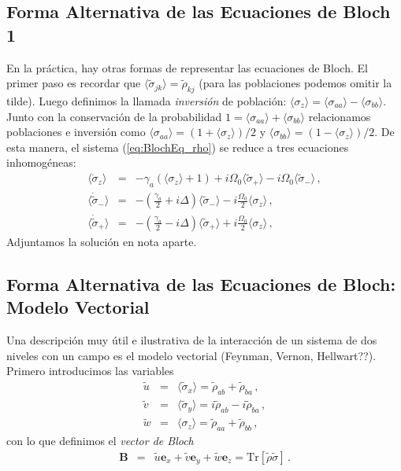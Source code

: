 \documentclass[12pt]{report}
\newcommand{\mbe}{\mathbf{e}}
\newcommand{\mbB}{\mathbf{B}}
\newcommand{\Tr}{\mathrm{Tr}}
\providecommand{\vxp}[1]{\langle #1 \rangle}
\begin{document}
\subsection{Forma Alternativa de las Ecuaciones de Bloch 1}  
En la pr\'actica, hay otras formas de representar las ecuaciones de Bloch. 
El primer paso es recordar que $\vxp{\tilde{\sigma}_{jk}} = \tilde{\rho}_{kj}$ 
(para las poblaciones podemos omitir la tilde). Luego definimos la llamada 
\textit{inversi\'on} de poblaci\'on: 
$\vxp{\sigma_z} = \vxp{\sigma_{aa}} -\vxp{\sigma_{bb}}$. Junto con la 
conservaci\'on de la probabilidad $1 = \vxp{\sigma_{aa}} +\vxp{\sigma_{bb}}$ 
relacionamos poblaciones e inversi\'on como 
$\vxp{\sigma_{aa}} = (1+ \vxp{\sigma_z})/2$ y 
$\vxp{\sigma_{bb}} = (1- \vxp{\sigma_z})/2$. De esta manera, el sistema 
(\ref{eq:BlochEq_rho}) se reduce a tres ecuaciones inhomog\'eneas: 
%
\begin{eqnarray} 	\label{eq:BlochEq_+-z}
\vxp{\dot{\sigma}_z} &=& - \gamma_a ( \vxp{\sigma_z} +1)  
	+ i \Omega_0 \vxp{\tilde{\sigma}_+} 
	- i \Omega_0 \vxp{\tilde{\sigma}_-}	\,, \nonumber \\ 
\vxp{\dot{\tilde{\sigma}}_-}
	&=& - \left( \frac{\gamma_a}{2} +i\Delta \right) \vxp{\tilde{\sigma}_-} 
	-i\frac{\Omega_0}{2} \vxp{\sigma_z} 	\,, \nonumber \\ 
\vxp{\dot{\tilde{\sigma}}_+}
	&=& - \left( \frac{\gamma_a}{2} -i\Delta \right) 
	\vxp{\tilde{\sigma}_+} +i\frac{\Omega_0}{2} \vxp{\sigma_z} 	\,, 
\end{eqnarray}
Adjuntamos la soluci\'on en nota aparte.  

\subsection{Forma Alternativa de las Ecuaciones de Bloch: 
Modelo Vectorial} 
Una descripci\'on muy \'util e ilustrativa de la interacci\'on de un sistema 
de dos niveles con un campo es el modelo vectorial (Feynman, Vernon, 
Hellwart??). Primero introducimos las variables 
%
\begin{subequations}
\begin{eqnarray}
\tilde{u} &=& \vxp{\tilde{\sigma}_x} = \tilde{\rho}_{ab} + \tilde{\rho}_{ba} \,, \\ 
\tilde{v} &=& \vxp{\tilde{\sigma}_y} = i \tilde{\rho}_{ab} - i \tilde{\rho}_{ba} \,, \\ 
\tilde{w} &=& \vxp{\sigma_z} = \tilde{\rho}_{aa} + \tilde{\rho}_{bb} \,, 
\end{eqnarray}
\end{subequations}
con lo que definimos el \textit{vector de Bloch} 
%
\begin{eqnarray}
\mbB &=& \tilde{u} \mbe_x + \tilde{v} \mbe_y +  \tilde{w} \mbe_z 
	= \Tr [ \tilde{\rho} \tilde{\sigma} ] \,.
\end{eqnarray}
\end{document}
